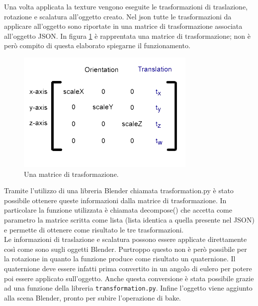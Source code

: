 Una volta applicata la texture vengono eseguite le trasformazioni di traslazione, rotazione e scalatura all’oggetto creato.
Nel json tutte le trasformazioni da applicare all’oggetto sono riportate in una matrice di trasformazione associata all’oggetto JSON. In figura \ref{fig:baking_service_matrix} è rapprentata una matrice di trasformazione; non è però compito di questa elaborato spiegarne il funzionamento.
\\
\begin{figure}[htb]
 \centering
 \includegraphics[width=0.6\linewidth]{images/chapter_baking_service/matrix.jpg}\hfill
 \caption[Matrice di trasformazione]{Una matrice di trasformazione.}
 \label{fig:baking_service_matrix}
\end{figure}

Tramite l’utilizzo di una libreria Blender chiamata trasformation.py è stato possibile ottenere queste informazioni dalla matrice di trasformazione. 
In particolare la funzione utilizzata è chiamata decompose() che accetta come parametro la matrice scritta come lista (lista identica a quella presente nel JSON) e permette di ottenere come risultato le tre trasformazioni.
\\
Le informazioni di traslazione e scalatura possono essere applicate direttamente così come sono sugli oggetti Blender. 
Purtroppo questo non è però possibile per la rotazione in quanto la funzione produce come risultato un quaternione. Il quaternione deve essere infatti prima convertito in un angolo di eulero per potere poi essere applicato sull’oggetto.
Anche questa conversione è stata possibile grazie ad una funzione della libreria \texttt{transformation.py}.
Infine l’oggetto viene aggiunto alla scena Blender, pronto per subire l’operazione di bake.

